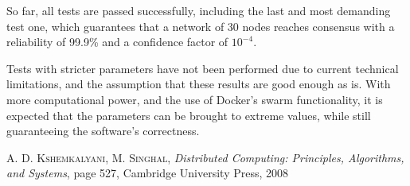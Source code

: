 \documentclass{article}
\begin{document}
    So far, all tests are passed successfully, including the last and most demanding test one, which guarantees that a network of 30 nodes reaches consensus with a reliability of 99.9\% and a confidence factor of $10^{-4}$.
    
    Tests with stricter parameters have not been performed due to current technical limitations, and the assumption that these results are good enough as is. With more computational power, and the use of Docker's swarm functionality, it is expected that the parameters can be brought to extreme values, while still guaranteeing the software's correctness.


    \begin{thebibliography}{9}
            \textsc{A. D. Kshemkalyani, M. Singhal},
            \textit{Distributed Computing: Principles, Algorithms, and Systems}, page 527,
            Cambridge University Press, 2008

    \end{thebibliography}
\end{document}
